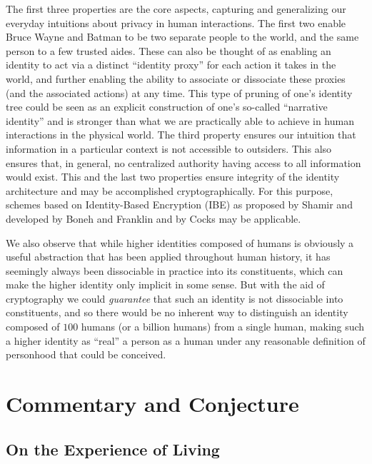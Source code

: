 \documentclass[pra,twocolumn,groupedaddress,10pt]{revtex4}
\theoremstyle{definition}
\begin{document}
The first three properties are the core aspects, capturing and generalizing our everyday intuitions about privacy in human interactions. The first two enable Bruce Wayne and Batman to be two separate people to the world, and the same person to a few trusted aides. These can also be thought of as enabling an identity to act via a distinct ``identity proxy'' for each action it takes in the world, and further enabling the ability to associate or dissociate these proxies (and the associated actions) at any time. This type of pruning of one's identity tree could be seen as an explicit construction of one's so-called ``narrative identity''\cite{narrativeidentity} and is stronger than what we are practically able to achieve in human interactions in the physical world. The third property ensures our intuition that information in a particular context is not accessible to outsiders. This also ensures that, in general, no centralized authority having access to all information would exist. This and the last two properties ensure integrity of the identity architecture and may be accomplished cryptographically. For this purpose, schemes based on Identity-Based Encryption (IBE) as proposed by Shamir\cite{shamir} and developed by Boneh and Franklin\cite{boneh} and by Cocks\cite{cocks} may be applicable.

We also observe that while higher identities composed of humans is obviously a useful abstraction that has been applied throughout human history, it has seemingly always been dissociable in practice into its constituents, which can make the higher identity only implicit in some sense. But with the aid of cryptography we could \textit{guarantee} that such an identity is not dissociable into constituents, and so there would be no inherent way to distinguish an identity composed of $100$ humans (or a billion humans) from a single human, making such a higher identity as ``real'' a person as a human under any reasonable definition of personhood that could be conceived.


\section{Commentary and Conjecture} \label{sec:comcon}

\subsection{On the Experience of Living} \label{sec:expliv}
\end{document}
